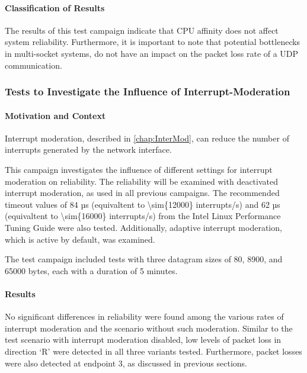\paragraph{Classification of Results}
The results of this test campaign indicate that CPU affinity does not affect system reliability. Furthermore, it is important to note that potential bottlenecks in multi-socket systems, do not have an impact on the packet loss rate of a UDP communication.


\subsubsection{Tests to Investigate the Influence of Interrupt-Moderation} \label{chap:RelInterMod}
\paragraph{Motivation and Context}

Interrupt moderation, described in \ref{chap:InterMod}, can reduce the number of interrupts generated by the network interface.

This campaign investigates the influence of different settings for interrupt moderation on reliability. The reliability will be examined with deactivated interrupt moderation, as used in all previous campaigns. The recommended timeout values of 84 µs (equivaltent to \num{\sim{12000}} interrupts/s) and 62 µs (equivaltent to \num{\sim{16000}} interrupts/s) from the Intel Linux Performance Tuning Guide \cite{intermod03} were also tested. Additionally, adaptive interrupt moderation, which is active by default, was examined.  

The test campaign included tests with three datagram sizes of 80, 8900, and 65000 bytes, each with a duration of 5 minutes.

\paragraph{Results}
No significant differences in reliability were found among the various rates of interrupt moderation and the scenario without such moderation. Similar to the test scenario with interrupt moderation disabled, low levels of packet loss in direction `R' were detected in all three variants tested. Furthermore, packet losses were also detected at endpoint 3, as discussed in previous sections.

